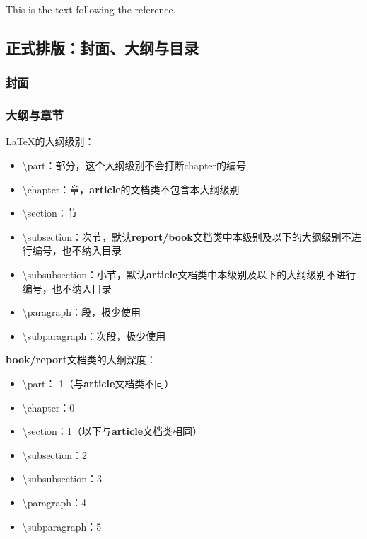 \documentclass{ctexart}
\begin{document}
            This is the text following the reference. 


    \subsection{正式排版：封面、大纲与目录}
        \subsubsection{封面}
        \subsubsection{大纲与章节}
            \LaTeX 的大纲级别：

            \begin{itemize}
                \item \textbackslash part：部分，这个大纲级别不会打断chapter的编号
                \item \textbackslash chapter：章，\textbf{article}的文档类不包含本大纲级别
                \item \textbackslash section：节
                \item \textbackslash subsection：次节，默认\textbf{report/book}文档类中本级别及以下的大纲级别不进行编号，也不纳入目录
                \item \textbackslash subsubsection：小节，默认\textbf{article}文档类中本级别及以下的大纲级别不进行编号，也不纳入目录
                \item \textbackslash paragraph：段，极少使用
                \item \textbackslash subparagraph：次段，极少使用
            \end{itemize}

            \textbf{book/report}文档类的大纲深度：

            \begin{itemize}
                \item \textbackslash part：-1（与\textbf{article}文档类不同）
                \item \textbackslash chapter：0
                \item \textbackslash section：1（以下与\textbf{article}文档类相同）
                \item \textbackslash subsection：2
                \item \textbackslash subsubsection：3
                \item \textbackslash paragraph：4
                \item \textbackslash subparagraph：5
            \end{itemize}
\end{document}
